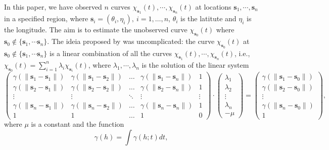 \documentclass[]{interact}
\theoremstyle{plain}%
\theoremstyle{definition}
\theoremstyle{remark}
\begin{document}
In this paper, we have observed \(n\) curves \(\chi_{\bm{s}_1}(t), \cdots, \chi_{\bm{s}_n}(t)\) at locations \(\bm{s}_1, \cdots, \bm{s}_n\) in a specified region,
where \(\bm{s}_i = (\theta_i, \eta_i), \ i =1, \dots, n\), \(\theta_i\) is the latitute and \(\eta_i\) is the longitude. The aim is to estimate the unobserved curve
\(\chi_{\bm{s}_0}(t)\) where \(\bm{s}_0 \not\in \{\bm{s}_1, \cdots \bm{s}_n \}\). The ideia proposed by \cite{giraldo2011ordinary} was uncomplicated:
the curve \(\chi_{\bm{s}_0}(t)\) at \(\bm{s}_0 \not\in \{\bm{s}_1, \cdots \bm{s}_n \}\) is a linear combination of all the curves \(\chi_{\bm{s}_1}(t), \cdots, \chi_{\bm{s}_n}(t)\), i.e.,
\(\chi_{\bm{s}_0}(t) = \sum_{i=1}^{n} \lambda_i \chi_{\bm{s}_i}(t)\), where \(\lambda_1, \cdots, \lambda_n\) is the solution of the linear system
\begin{equation*}
    \begin{pmatrix}
    \gamma(\lVert\bm{s}_1 - \bm{s}_1\rVert) & \gamma(\lVert\bm{s}_1 - \bm{s}_2\rVert) & \dots & \gamma(\lVert\bm{s}_{1} - \bm{s}_n\rVert) & 1\\
    \gamma(\lVert\bm{s}_2 - \bm{s}_1\rVert) & \gamma(\lVert\bm{s}_2 - \bm{s}_2\rVert) & \dots & \gamma(\lVert\bm{s}_{2} - \bm{s}_n\rVert) & 1\\
    \vdots & \vdots & \ddots & \vdots &\vdots\\
    \gamma(\lVert\bm{s}_{n} - \bm{s}_1\rVert) & \gamma(\lVert\bm{s}_{n} - \bm{s}_2\rVert) & \dots & \gamma(\lVert\bm{s}_{n} - \bm{s}_{n}\rVert) & 1\\
    1 & 1 & \dots & 1 & 0
    \end{pmatrix} 
    \cdot 
    \begin{pmatrix}
    \lambda_1\\
    \lambda_2\\
    \vdots\\
    \lambda_{n}\\
    -\mu
    \end{pmatrix} 
    =
    \begin{pmatrix}
    \gamma(\lVert\bm{s}_1 - \bm{s}_0\rVert)\\
    \gamma(\lVert\bm{s}_2 - \bm{s}_0\rVert)\\
    \vdots\\
    \gamma(\lVert\bm{s}_{n}- \bm{s}_0\rVert)\\
    1
    \end{pmatrix},
\end{equation*}
where \(\mu\) is a constant and the function
\begin{equation} \label{eq:trace_intro}
 \gamma(h) = \int \gamma(h;t)dt,
\end{equation}
\end{document}
